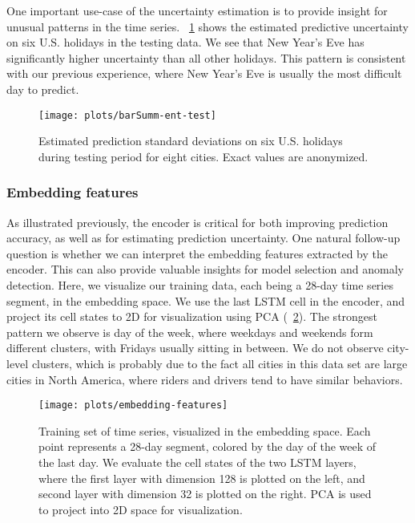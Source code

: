 \documentclass[conference,compsoc,final]{IEEEtran}
\begin{document}
One important use-case of the uncertainty estimation is to provide insight for unusual patterns in the time series. \figurename~\ref{fig:barplot-holiday} shows the estimated predictive uncertainty on six U.S. holidays in the testing data. We see that New Year's Eve has significantly higher uncertainty than all other holidays. This pattern is consistent with our previous experience, where New Year's Eve is usually the most difficult day to predict. 
\begin{figure}[!t]
\centering
\texttt{[image: plots/barSumm-ent-test]}
\caption{Estimated prediction standard deviations on six U.S. holidays during testing period for eight cities. Exact values are anonymized. }
\label{fig:barplot-holiday}
\end{figure}


\subsubsection{Embedding features}
As illustrated previously, the encoder is critical for both improving prediction accuracy, as well as for estimating prediction uncertainty. One natural follow-up question is whether we can interpret the embedding features extracted by the encoder. This can also provide valuable insights for model selection and anomaly detection. Here, we visualize our training data, each being a 28-day time series segment, in the embedding space. We use the last LSTM cell in the encoder, and project its cell states to 2D for visualization using PCA (\figurename~\ref{fig:embedding}). The strongest pattern we observe is day of the week, where weekdays and weekends form different clusters, with Fridays usually sitting in between. We do not observe city-level clusters, which is probably due to the fact all cities in this data set are large cities in North America, where riders and drivers tend to have similar behaviors.
\begin{figure}[!t]
\centering
\texttt{[image: plots/embedding-features]}
\caption{Training set of time series, visualized in the embedding space. Each point represents a 28-day segment, colored by the day of the week of the last day. We evaluate the cell states of the two LSTM layers, where the first layer with dimension 128 is plotted on the left, and second layer with dimension 32 is plotted on the right. PCA is used to project into 2D space for visualization.}
\label{fig:embedding}
\end{figure}
\end{document}
